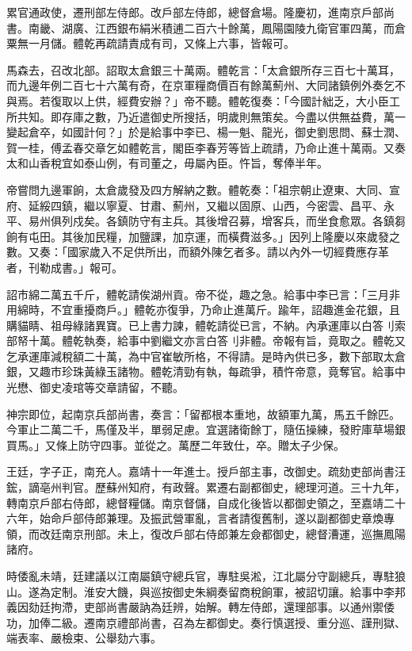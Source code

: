 \begin{pinyinscope}
累官通政使，遷刑部左侍郎。改戶部左侍郎，總督倉場。隆慶初，進南京戶部尚書。南畿、湖廣、江西銀布絹米積逋二百六十餘萬，鳳陽園陵九衛官軍四萬，而倉粟無一月儲。體乾再疏請責成有司，又條上六事，皆報可。

馬森去，召改北部。詔取太倉銀三十萬兩。體乾言：「太倉銀所存三百七十萬耳，而九邊年例二百七十六萬有奇，在京軍糧商價百有餘萬薊州、大同諸鎮例外奏乞不與焉。若復取以上供，經費安辦？」帝不聽。體乾復奏：「今國計絀乏，大小臣工所共知。即存庫之數，乃近遣御史所搜括，明歲則無策矣。今盡以供無益費，萬一變起倉卒，如國計何？」於是給事中李已、楊一魁、龍光，御史劉思問、蘇士潤、賀一桂，傅孟春交章乞如體乾言，閣臣李春芳等皆上疏請，乃命止進十萬兩。又奏太和山香稅宜如泰山例，有司董之，毋屬內臣。忤旨，奪俸半年。

帝嘗問九邊軍餉，太倉歲發及四方解納之數。體乾奏：「祖宗朝止遼東、大同、宣府、延綏四鎮，繼以寧夏、甘肅、薊州，又繼以固原、山西，今密雲、昌平、永平、易州俱列戍矣。各鎮防守有主兵。其後增召募，增客兵，而坐食愈眾。各鎮芻餉有屯田。其後加民糧，加鹽課，加京運，而橫費滋多。」因列上隆慶以來歲發之數。又奏：「國家歲入不足供所出，而額外陳乞者多。請以內外一切經費應存革者，刊勒成書。」報可。

詔市綿二萬五千斤，體乾請俟湖州貢。帝不從，趣之急。給事中李已言：「三月非用綿時，不宜重擾商戶。」體乾亦復爭，乃命止進萬斤。踰年，詔趣進金花銀，且購貓睛、祖母綠諸異寶。已上書力諫，體乾請從已言，不納。內承運庫以白答刂索部帑十萬。體乾執奏，給事中劉繼文亦言白答刂非體。帝報有旨，竟取之。體乾又乞承運庫減稅額二十萬，為中官崔敏所格，不得請。是時內供已多，數下部取太倉銀，又趣市珍珠黃綠玉諸物。體乾清勁有執，每疏爭，積忤帝意，竟奪官。給事中光懋、御史凌琯等交章請留，不聽。

神宗即位，起南京兵部尚書，奏言：「留都根本重地，故額軍九萬，馬五千餘匹。今軍止二萬二千，馬僅及半，單弱足慮。宜選諸衛餘丁，隨伍操練，發貯庫草場銀買馬。」又條上防守四事。並從之。萬歷二年致仕，卒。贈太子少保。

王廷，字子正，南充人。嘉靖十一年進士。授戶部主事，改御史。疏劾吏部尚書汪鋐，謫亳州判官。歷蘇州知府，有政聲。累遷右副都御史，總理河道。三十九年，轉南京戶部右侍郎，總督糧儲。南京督儲，自成化後皆以都御史領之，至嘉靖二十六年，始命戶部侍郎兼理。及振武營軍亂，言者請復舊制，遂以副都御史章煥專領，而改廷南京刑部。未上，復改戶部右侍郎兼左僉都御史，總督漕運，巡撫鳳陽諸府。

時倭亂未靖，廷建議以江南屬鎮守總兵官，專駐吳淞，江北屬分守副總兵，專駐狼山。遂為定制。淮安大饑，與巡按御史朱綱奏留商稅餉軍，被詔切讓。給事中李邦義因劾廷拘滯，吏部尚書嚴訥為廷辨，始解。轉左侍郎，還理部事。以通州禦倭功，加俸二級。遷南京禮部尚書，召為左都御史。奏行慎選授、重分巡、謹刑獄、端表率、嚴檢束、公舉劾六事。


\end{pinyinscope}

